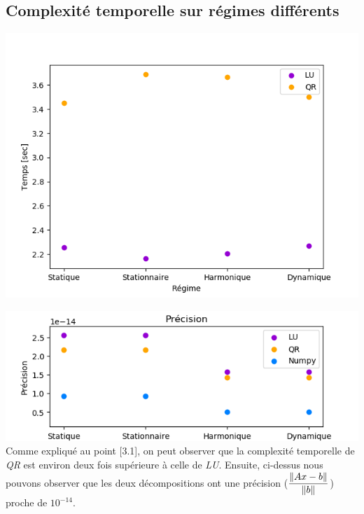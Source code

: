 \documentclass{article}[11pt]
\begin{document}
\subsection{Complexité temporelle sur régimes différents}
\noindent\begin{minipage}{0.5\textwidth}
\includegraphics[width=\textwidth]{./res/plots/regimes.png}
\end{minipage}%
\begin{minipage}{0.5\textwidth}
\includegraphics[width=\textwidth]{./res/plots/accuracyNumpy.png}
Comme expliqué au point [3.1], on peut observer que la complexité temporelle de \textit{QR} est environ deux fois supérieure à celle de \textit{LU}. Ensuite, ci-dessus nous pouvons observer que les deux décompositions ont une précision ($\dfrac{\left\lVert Ax-b\right\rVert}{\left\lVert b\right\rVert}$) proche de $10^{-14}$.
\end{minipage}
\end{document}
